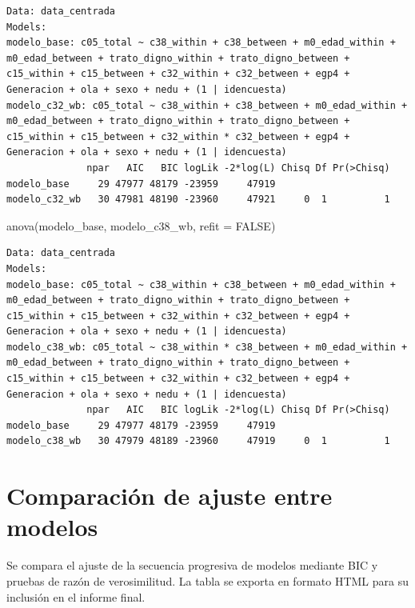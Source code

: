 \documentclass[
  spanish,
  a4paper,
  oneside]{scrbook}
\newenvironment{Shaded}{\begin{snugshade}}{\end{snugshade}}
\newcommand{\AttributeTok}[1]{\textcolor[rgb]{0.40,0.45,0.13}{#1}}
\newcommand{\ConstantTok}[1]{\textcolor[rgb]{0.56,0.35,0.01}{#1}}
\newcommand{\FunctionTok}[1]{\textcolor[rgb]{0.28,0.35,0.67}{#1}}
\newcommand{\NormalTok}[1]{\textcolor[rgb]{0.00,0.23,0.31}{#1}}
\begin{document}
\begin{verbatim}
Data: data_centrada
Models:
modelo_base: c05_total ~ c38_within + c38_between + m0_edad_within + m0_edad_between + trato_digno_within + trato_digno_between + c15_within + c15_between + c32_within + c32_between + egp4 + Generacion + ola + sexo + nedu + (1 | idencuesta)
modelo_c32_wb: c05_total ~ c38_within + c38_between + m0_edad_within + m0_edad_between + trato_digno_within + trato_digno_between + c15_within + c15_between + c32_within * c32_between + egp4 + Generacion + ola + sexo + nedu + (1 | idencuesta)
              npar   AIC   BIC logLik -2*log(L) Chisq Df Pr(>Chisq)
modelo_base     29 47977 48179 -23959     47919                    
modelo_c32_wb   30 47981 48190 -23960     47921     0  1          1
\end{verbatim}

\begin{Shaded}
\begin{Highlighting}[]
\FunctionTok{anova}\NormalTok{(modelo\_base, modelo\_c38\_wb,   }\AttributeTok{refit =} \ConstantTok{FALSE}\NormalTok{)}
\end{Highlighting}
\end{Shaded}

\begin{verbatim}
Data: data_centrada
Models:
modelo_base: c05_total ~ c38_within + c38_between + m0_edad_within + m0_edad_between + trato_digno_within + trato_digno_between + c15_within + c15_between + c32_within + c32_between + egp4 + Generacion + ola + sexo + nedu + (1 | idencuesta)
modelo_c38_wb: c05_total ~ c38_within * c38_between + m0_edad_within + m0_edad_between + trato_digno_within + trato_digno_between + c15_within + c15_between + c32_within + c32_between + egp4 + Generacion + ola + sexo + nedu + (1 | idencuesta)
              npar   AIC   BIC logLik -2*log(L) Chisq Df Pr(>Chisq)
modelo_base     29 47977 48179 -23959     47919                    
modelo_c38_wb   30 47979 48189 -23960     47919     0  1          1
\end{verbatim}

\chapter{Comparación de ajuste entre
modelos}\label{comparaciuxf3n-de-ajuste-entre-modelos}

Se compara el ajuste de la secuencia progresiva de modelos mediante BIC
y pruebas de razón de verosimilitud. La tabla se exporta en formato HTML
para su inclusión en el informe final.
\end{document}
